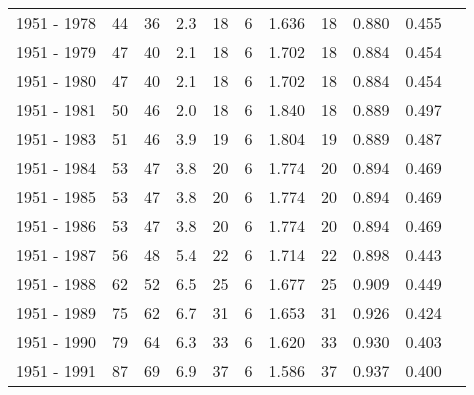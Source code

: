 \begin{tabular}{lrrrrrrrrrr}
1951 - 1978 &       44 &       36 &    2.3 &                      18 &                          6 &       1.636 &             18 &       0.880 &             0.455 \\
1951 - 1979 &       47 &       40 &    2.1 &                      18 &                          6 &       1.702 &             18 &       0.884 &             0.454 \\
1951 - 1980 &       47 &       40 &    2.1 &                      18 &                          6 &       1.702 &             18 &       0.884 &             0.454 \\
1951 - 1981 &       50 &       46 &    2.0 &                      18 &                          6 &       1.840 &             18 &       0.889 &             0.497 \\
1951 - 1983 &       51 &       46 &    3.9 &                      19 &                          6 &       1.804 &             19 &       0.889 &             0.487 \\
1951 - 1984 &       53 &       47 &    3.8 &                      20 &                          6 &       1.774 &             20 &       0.894 &             0.469 \\
1951 - 1985 &       53 &       47 &    3.8 &                      20 &                          6 &       1.774 &             20 &       0.894 &             0.469 \\
1951 - 1986 &       53 &       47 &    3.8 &                      20 &                          6 &       1.774 &             20 &       0.894 &             0.469 \\
1951 - 1987 &       56 &       48 &    5.4 &                      22 &                          6 &       1.714 &             22 &       0.898 &             0.443 \\
1951 - 1988 &       62 &       52 &    6.5 &                      25 &                          6 &       1.677 &             25 &       0.909 &             0.449 \\
1951 - 1989 &       75 &       62 &    6.7 &                      31 &                          6 &       1.653 &             31 &       0.926 &             0.424 \\
1951 - 1990 &       79 &       64 &    6.3 &                      33 &                          6 &       1.620 &             33 &       0.930 &             0.403 \\
1951 - 1991 &       87 &       69 &    6.9 &                      37 &                          6 &       1.586 &             37 &       0.937 &             0.400 \\

\end{tabular}

